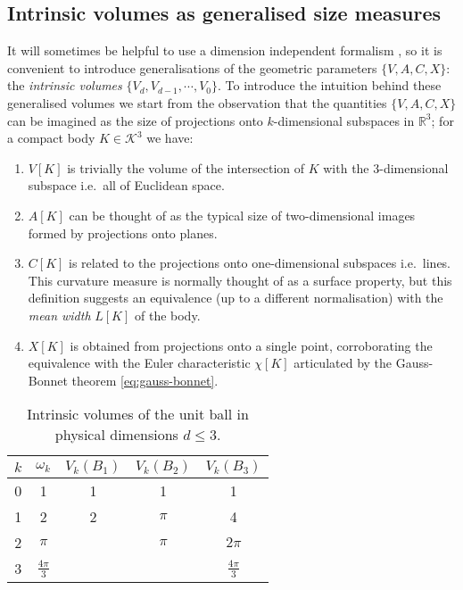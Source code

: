 \subsection{Intrinsic volumes as generalised size measures}

It will sometimes be helpful to use a dimension independent formalism%
,
so it is convenient to introduce generalisations of the geometric parameters $\{V,A,C,X\}$: the \emph{intrinsic volumes} $\{V_d, V_{d-1}, \cdots, V_0\}$.
To introduce the intuition behind these generalised volumes we start from the observation that the quantities $\{V,A,C,X\}$ can be imagined as the size of projections onto $k$-dimensional subspaces in $\mathbb{R}^3$; for a compact body $K \in \mathcal{K}^3$ we have:
\begin{enumerate}
\item $V[K]$ is trivially the volume of the intersection of $K$ with the 3-dimensional subspace i.e.\ all of Euclidean space.
\item $A[K]$ can be thought of as the typical size of two-dimensional images formed by projections onto planes.
\item $C[K]$ is related to the projections onto one-dimensional subspaces i.e.\ lines.
  This curvature measure is normally thought of as a surface property, but this definition suggests an equivalence (up to a different normalisation) with the \emph{mean width} $L[K]$ of the body.
\item $X[K]$ is obtained from projections onto a single point, corroborating the equivalence with the Euler characteristic $\chi[K]$ articulated by the Gauss-Bonnet theorem \eqref{eq:gauss-bonnet}.
\end{enumerate}

\begin{SCtable}
  \begin{minipage}[b]{\linewidth}
    \centering
    \begin{tabular}{ccccc}
      \toprule
      $k$ & $\omega_k$ & $V_k(B_1)$ & $V_k(B_2)$ & $V_k(B_3)$ \\
      \midrule
      0 & 1 & 1 & 1 & 1 \\
      1 & 2 & 2 & $\pi$ & 4 \\
      2 & $\pi$ && $\pi$ & $2\pi$ \\
      3 & $\frac{4\pi}{3}$ &&& $\frac{4\pi}{3}$ \\
      \bottomrule
    \end{tabular}
  \end{minipage}
  \caption{Intrinsic volumes of the unit ball in physical dimensions $d \le 3$.}
  \label{table:ball-intrinsic-volumes}
\end{SCtable}

